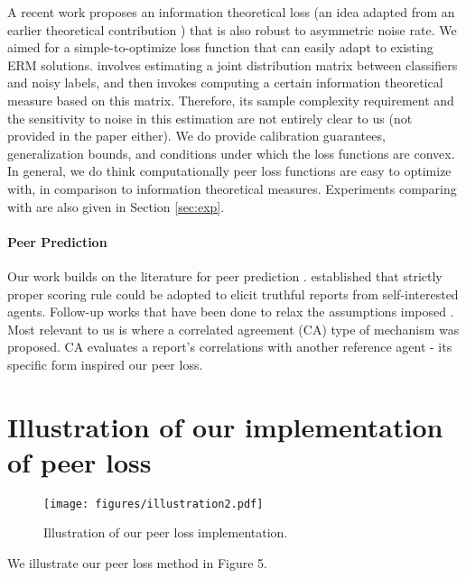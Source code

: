 { A recent work \citep{xu2019l_dmi} proposes an information theoretical loss (an idea adapted from an earlier theoretical contribution \citep{kong2018water}) that is also robust to asymmetric noise rate. We aimed for a simple-to-optimize loss function that can easily adapt to existing ERM solutions. \citep{xu2019l_dmi} involves estimating a joint distribution matrix between classifiers and noisy labels, and then invokes computing a certain information theoretical measure based on this matrix. Therefore, its sample complexity requirement and the sensitivity to noise in this estimation are not entirely clear to us (not provided in the paper either). We do provide calibration guarantees, generalization bounds, and conditions under which the loss functions are convex. In general, we do think computationally peer loss functions are easy to optimize with, in comparison to information theoretical measures. Experiments comparing with \citep{xu2019l_dmi} are also given in Section \ref{sec:exp}. 
}

\vspace{-0.1in}
\paragraph{Peer Prediction}

Our work builds on the literature for peer prediction \citep{prelec2004bayesian,MRZ:2005,witkowski2012robust,radanovic2013,Witkowski_hcomp13,dasgupta2013crowdsourced,shnayder2016informed,sub:ec17}. \citep{MRZ:2005} established that strictly proper scoring rule \citep{Gneiting:07} could be adopted to elicit truthful reports from self-interested agents.  Follow-up works that have been done to relax the assumptions imposed \citep{witkowski2012robust,radanovic2013,Witkowski_hcomp13,radanovic2016incentives,sub:ec17}.
Most relevant to us is \citep{dasgupta2013crowdsourced,shnayder2016informed} where a correlated agreement (CA) type of mechanism was proposed. CA evaluates a report's correlations with another reference agent - its specific form inspired our peer loss.

\section*{Illustration of our implementation of peer loss}

\begin{figure*}[!h]
\begin{center}
\texttt{[image: figures/illustration2.pdf]}
\caption{Illustration of our peer loss implementation.}
\end{center}
\label{mechanism:ill_plf} 
\end{figure*}
We illustrate our peer loss method in Figure 5. 


